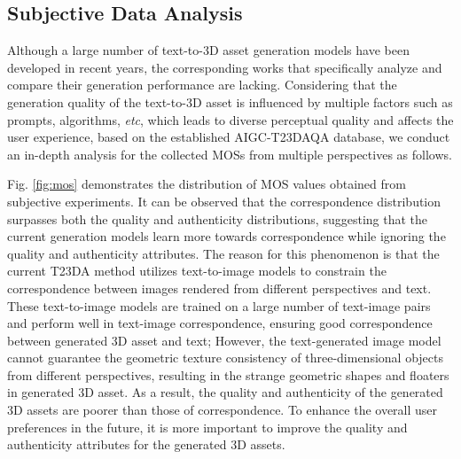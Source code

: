 \subsection{Subjective Data Analysis}
Although a large number of text-to-3D asset generation models have been developed in recent years, the corresponding works that specifically analyze and compare their generation performance are lacking. Considering that the generation quality of the text-to-3D asset is influenced by multiple factors such as prompts, algorithms, \textit{etc}, which leads to diverse perceptual quality and affects the user experience, based on the established AIGC-T23DAQA database, we conduct an in-depth analysis for the collected MOSs from multiple perspectives as follows.

Fig. \ref{fig:mos} demonstrates the distribution of MOS values obtained from subjective experiments. It can be observed that the correspondence distribution surpasses both the quality and authenticity distributions, suggesting that the current generation models learn more towards correspondence while ignoring the quality and authenticity attributes. The reason for this phenomenon is that the current T23DA method utilizes text-to-image models to constrain the correspondence between images rendered from different perspectives and text. These text-to-image models are trained on a large number of text-image pairs and perform well in text-image correspondence, ensuring good correspondence between generated 3D asset and text; However, the text-generated image model cannot guarantee the geometric texture consistency of three-dimensional objects from different perspectives, resulting in the strange geometric shapes and floaters in generated 3D asset. As a result, the quality and authenticity of the generated 3D assets are poorer than those of correspondence. To enhance the overall user preferences in the future, it is more important to improve the quality and authenticity attributes for the generated 3D assets.

